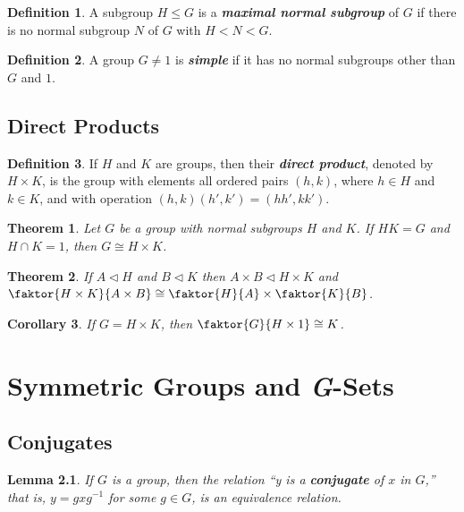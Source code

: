 \documentclass[12pt]{report}
\newtheorem{theorem}{Theorem}[chapter]
\newtheorem{corollary}[theorem]{Corollary}
\newtheorem{lemma}[theorem]{Lemma}
\theoremstyle{definition}
\newtheorem*{definition}{Definition}
\newcommand{\term}[1]{\textbf{\textit{#1}}}
\begin{document}
\begin{definition}
	A subgroup $H\leq G$ is a \term{maximal normal subgroup} of $G$ if there is no normal subgroup $N$ of $G$ with $H<N<G$.
\end{definition}

\begin{definition}
	A group $G\neq 1$ is \term{simple} if it has no normal subgroups other than $G$ and $1$.
\end{definition}



\section{Direct Products}

\begin{definition}
	If $H$ and $K$ are groups, then their \term{direct product}, denoted by $H\times K$, is the group with elements all
	ordered pairs $(h, k)$, where $h\in H$ and $k\in K$, and with operation $(h, k)(h', k')=(hh', kk')$.
\end{definition}

\begin{theorem}
	Let $G$ be a group with normal subgroups $H$ and $K$. If $HK=G$ and $H\cap K=1$, then $G\cong H\times K$.
\end{theorem}

\begin{theorem}
	If $A\vartriangleleft H$ and $B\vartriangleleft K$ then $A\times B\vartriangleleft H\times K$ and
	$\faktor{H\times K}{A\times B}\cong\faktor{H}{A}\times\faktor{K}{B}$.
\end{theorem}

\begin{corollary}
	If $G=H\times K$, then $\faktor{G}{H\times 1}\cong K$.
\end{corollary}


\chapter{Symmetric Groups and \textit{G}-Sets}

\section{Conjugates}
\begin{lemma}
	If $G$ is a group, then the relation “y is a \term{conjugate} of $x$ in $G$,” that is, $y=gxg^{-1}$ for some $g\in G$, is an equivalence relation.
\end{lemma}
\end{document}
